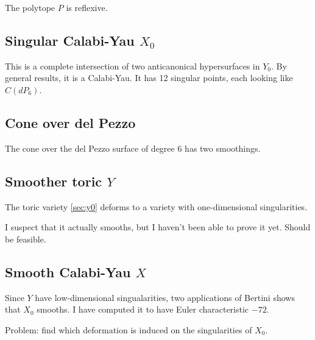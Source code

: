 \documentclass[11pt, english]{article}
\begin{document}
The polytope $P$ is reflexive.

\subsection{Singular Calabi-Yau $X_0$}
\label{sec:x0}

This is a complete intersection of two anticanonical hypersurfaces in $Y_0$. By general results, it is a Calabi-Yau. It has 12 singular points, each looking like $C(dP_6)$.

\subsection{Cone over del Pezzo}
\label{sec:cdp6}

The cone over the del Pezzo surface of degree $6$ has two smoothings.

\subsection{Smoother toric $Y$}
\label{sec:y}

The toric variety \ref{sec:y0} deforms to a variety with one-dimensional singularities.

\begin{remark}
I suspect that it actually smooths, but I haven't been able to prove it yet. Should be feasible.
\end{remark}

\subsection{Smooth Calabi-Yau $X$}

Since $Y$ have low-dimensional singualarities, two applications of Bertini shows that $X_0$ smooths. I have computed it to have Euler characteristic $-72$.

Problem: find which deformation is induced on the singularities of $X_0$. 
\end{document}
